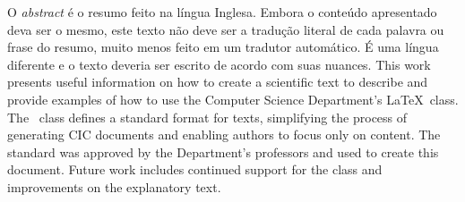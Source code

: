O \emph{abstract} é o resumo feito na língua Inglesa. Embora o conteúdo apresentado
deva ser o mesmo, este texto não deve ser a tradução literal de cada palavra ou 
frase do resumo, muito menos feito em um tradutor automático. É uma língua 
diferente e o texto deveria ser escrito de acordo com suas nuances.
This work presents useful information on how to create a scientific text to describe
and provide examples of how to use the Computer Science Department's \LaTeX\ class. The \unbcic\
class defines a standard format for texts, simplifying the process of generating
CIC documents and enabling authors to focus only on content. The standard was approved
by the Department's professors and used to create this document. Future work includes
continued support for the class and improvements on the explanatory text.